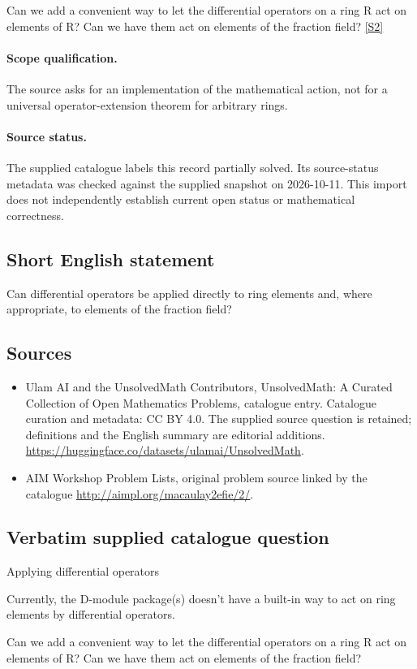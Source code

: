 \documentclass[11pt]{article}
\begin{document}
Can we add a convenient way to let the differential operators on a ring R act on elements of R? Can we have them act on elements of the fraction field? \href{http://aimpl.org/macaulay2efie/2/}{[S2]}
\paragraph{Scope qualification.}
The source asks for an implementation of the mathematical action, not for a universal operator-extension theorem for arbitrary rings.
\paragraph{Source status.}
The supplied catalogue labels this record partially solved. Its source-status metadata was checked against the supplied snapshot on 2026-10-11. This import does not independently establish current open status or mathematical correctness.
\subsection{Short English statement}
Can differential operators be applied directly to ring elements and, where appropriate, to elements of the fraction field?
\subsection{Sources}
\begin{itemize}
\item[S1] Ulam AI and the UnsolvedMath Contributors, UnsolvedMath: A Curated Collection of Open Mathematics Problems, catalogue entry. Catalogue curation and metadata: CC BY 4.0. The supplied source question is retained; definitions and the English summary are editorial additions.
\url{https://huggingface.co/datasets/ulamai/UnsolvedMath}.
\item[S2] AIM Workshop Problem Lists, original problem source linked by the catalogue
\url{http://aimpl.org/macaulay2efie/2/}.
\end{itemize}
\subsection{Verbatim supplied catalogue question}
Applying differential operators

Currently, the D-module package(s) doesn't have a built-in way to act on ring elements by differential operators.

Can we add a convenient way to let the differential operators on a ring R act on elements of R? Can we have them act on elements of the fraction field?
\end{document}
